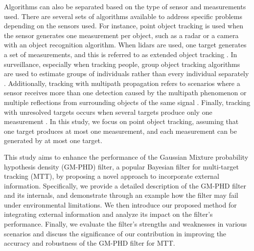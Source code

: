 Algorithms can also be separated based on the type of sensor and measurements used. There are several sets of algorithms available to address specific problems depending on the sensors used. For instance, point object tracking is used when the sensor generates one measurement per object, such as a radar or a camera with an object recognition algorithm. When lidars are used, one target generates a set of measurements, and this is referred to as extended object tracking \cite{granstromExtendedObjectTracking2017}. In surveillance, especially when tracking people, group object tracking algorithms are used to estimate groups of individuals rather than every individual separately \cite{salmondGroupExtendedObject1999}. Additionally, tracking with multipath propagation refers to scenarios where a sensor receives more than one detection caused by the multipath phenomenon or multiple reflections from surrounding objects of the same signal \cite{bar-shalomTrackingLowElevation1994}. Finally, tracking with unresolved targets occurs when several targets produce only one measurement \cite{angleMultipleTargetTracking2021}. In this study, we focus on point object tracking, assuming that one target produces at most one measurement, and each measurement can be generated by at most one target.

This study aims to enhance the performance of the Gaussian Mixture probability hypothesis density (GM-PHD) filter, a popular Bayesian filter for multi-target tracking (MTT), by proposing a novel approach to incorporate external information. Specifically, we provide a detailed description of the GM-PHD filter and its internals, and demonstrate through an example how the filter may fail under environmental limitations. We then introduce our proposed method for integrating external information and analyze its impact on the filter's performance. Finally, we evaluate the filter's strengths and weaknesses in various scenarios and discuss the significance of our contribution in improving the accuracy and robustness of the GM-PHD filter for MTT.
